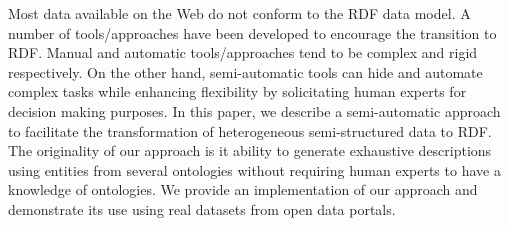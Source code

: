 Most data available on the Web do not conform to the RDF data model. A number of tools/approaches have been developed to encourage the transition to RDF. Manual and automatic tools/approaches tend to be complex and rigid respectively. On the other hand, semi-automatic tools can hide and automate complex tasks while enhancing flexibility by solicitating human experts for decision making purposes. In this paper, we describe a semi-automatic approach to facilitate the transformation of heterogeneous semi-structured data to RDF. The originality of our approach is it ability to generate exhaustive descriptions using entities from several ontologies without requiring human experts to have a knowledge of ontologies. We provide an implementation of our approach and demonstrate its use using real datasets from open data portals.





